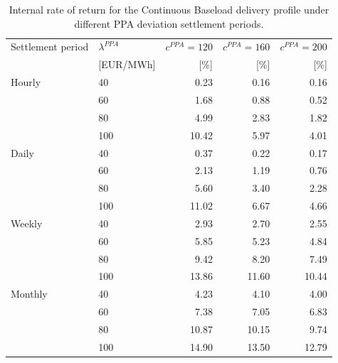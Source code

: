 \begin{table}[H]
\centering
\small
\caption{Internal rate of return for the Continuous Baseload delivery profile under different PPA deviation settlement periods.}
\label{tab:irr_continuous_baseload}
\begin{tabular}{llrrr}
\toprule
Settlement period & $\lambda^{PPA}$ & $c^{PPA}=120$ & $c^{PPA}=160$ & $c^{PPA}=200$ \\
 & [EUR/MWh] & [\%] & [\%] & [\%] \\
\midrule
Hourly & 40 & 0.23 & 0.16 & 0.16 \\
 & 60 & 1.68 & 0.88 & 0.52 \\
 & 80 & 4.99 & 2.83 & 1.82 \\
 & 100 & 10.42 & 5.97 & 4.01 \\
\addlinespace
Daily & 40 & 0.37 & 0.22 & 0.17 \\
 & 60 & 2.13 & 1.19 & 0.76 \\
 & 80 & 5.60 & 3.40 & 2.28 \\
 & 100 & 11.02 & 6.67 & 4.66 \\
\addlinespace
Weekly & 40 & 2.93 & 2.70 & 2.55 \\
 & 60 & 5.85 & 5.23 & 4.84 \\
 & 80 & 9.42 & 8.20 & 7.49 \\
 & 100 & 13.86 & 11.60 & 10.44 \\
\addlinespace
Monthly & 40 & 4.23 & 4.10 & 4.00 \\
 & 60 & 7.38 & 7.05 & 6.83 \\
 & 80 & 10.87 & 10.15 & 9.74 \\
 & 100 & 14.90 & 13.50 & 12.79 \\
\bottomrule
\end{tabular}
\end{table}
